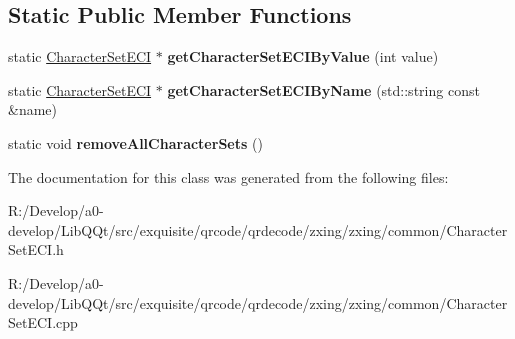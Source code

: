 \subsection*{Static Public Member Functions}
\begin{DoxyCompactItemize}
\item 
\mbox{\label{classzxing_1_1common_1_1_character_set_e_c_i_ab12c5350db3df75043ca775302179481}} 
static \mbox{\hyperlink{classzxing_1_1common_1_1_character_set_e_c_i}{Character\+Set\+E\+CI}} $\ast$ {\bfseries get\+Character\+Set\+E\+C\+I\+By\+Value} (int value)
\item 
\mbox{\label{classzxing_1_1common_1_1_character_set_e_c_i_aa224cde5fea82901c54f265b08714837}} 
static \mbox{\hyperlink{classzxing_1_1common_1_1_character_set_e_c_i}{Character\+Set\+E\+CI}} $\ast$ {\bfseries get\+Character\+Set\+E\+C\+I\+By\+Name} (std\+::string const \&name)
\item 
\mbox{\label{classzxing_1_1common_1_1_character_set_e_c_i_a60dc7be0611db53ca1f45a68c92e26b8}} 
static void {\bfseries remove\+All\+Character\+Sets} ()
\end{DoxyCompactItemize}


The documentation for this class was generated from the following files\+:\begin{DoxyCompactItemize}
\item 
R\+:/\+Develop/a0-\/develop/\+Lib\+Q\+Qt/src/exquisite/qrcode/qrdecode/zxing/zxing/common/Character\+Set\+E\+C\+I.\+h\item 
R\+:/\+Develop/a0-\/develop/\+Lib\+Q\+Qt/src/exquisite/qrcode/qrdecode/zxing/zxing/common/Character\+Set\+E\+C\+I.\+cpp\end{DoxyCompactItemize}
